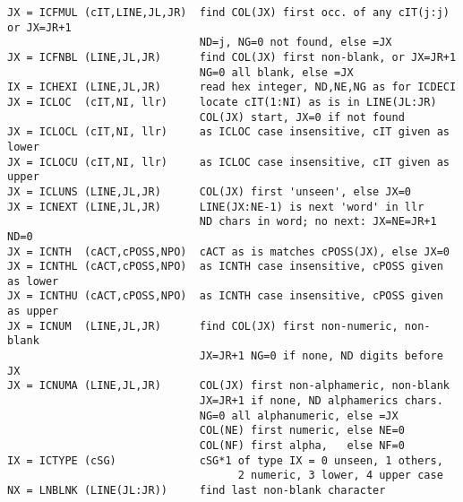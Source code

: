 \begin{verbatim}
JX = ICFMUL (cIT,LINE,JL,JR)  find COL(JX) first occ. of any cIT(j:j) or JX=JR+1
                              ND=j, NG=0 not found, else =JX
JX = ICFNBL (LINE,JL,JR)      find COL(JX) first non-blank, or JX=JR+1
                              NG=0 all blank, else =JX
IX = ICHEXI (LINE,JL,JR)      read hex integer, ND,NE,NG as for ICDECI
JX = ICLOC  (cIT,NI, llr)     locate cIT(1:NI) as is in LINE(JL:JR)
                              COL(JX) start, JX=0 if not found
JX = ICLOCL (cIT,NI, llr)     as ICLOC case insensitive, cIT given as lower
JX = ICLOCU (cIT,NI, llr)     as ICLOC case insensitive, cIT given as upper
JX = ICLUNS (LINE,JL,JR)      COL(JX) first 'unseen', else JX=0
JX = ICNEXT (LINE,JL,JR)      LINE(JX:NE-1) is next 'word' in llr
                              ND chars in word; no next: JX=NE=JR+1 ND=0
JX = ICNTH  (cACT,cPOSS,NPO)  cACT as is matches cPOSS(JX), else JX=0
JX = ICNTHL (cACT,cPOSS,NPO)  as ICNTH case insensitive, cPOSS given as lower
JX = ICNTHU (cACT,cPOSS,NPO)  as ICNTH case insensitive, cPOSS given as upper
JX = ICNUM  (LINE,JL,JR)      find COL(JX) first non-numeric, non-blank
                              JX=JR+1 NG=0 if none, ND digits before JX
JX = ICNUMA (LINE,JL,JR)      COL(JX) first non-alphameric, non-blank
                              JX=JR+1 if none, ND alphamerics chars.
                              NG=0 all alphanumeric, else =JX
                              COL(NE) first numeric, else NE=0
                              COL(NF) first alpha,   else NF=0
IX = ICTYPE (cSG)             cSG*1 of type IX = 0 unseen, 1 others,
                                    2 numeric, 3 lower, 4 upper case
NX = LNBLNK (LINE(JL:JR))     find last non-blank character
\end{verbatim}
